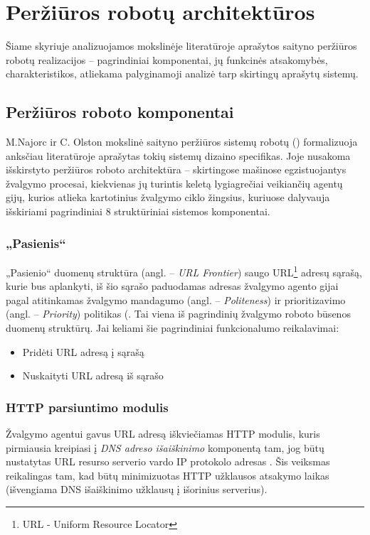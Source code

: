 \section{Peržiūros robotų architektūros}

Šiame skyriuje analizuojamos mokslinėje literatūroje aprašytos saityno peržiūros robotų realizacijos -- pagrindiniai komponentai, jų funkcinės atsakomybės, charakteristikos, atliekama palyginamoji analizė tarp skirtingų aprašytų sistemų.

\subsection{Peržiūros roboto komponentai}

M.Najorc ir C. Olston mokslinė saityno peržiūros sistemų robotų (\cite{StanfWebCrawl}) formalizuoja anksčiau literatūroje aprašytas tokių sistemų dizaino specifikas. Joje nusakoma išskirstyto peržiūros roboto architektūra -- skirtingose mašinose egzistuojantys žvalgymo procesai, kiekvienas jų turintis keletą lygiagrečiai veikiančių agentų gijų, kurios atlieka kartotinius žvalgymo ciklo žingsius, kuriuose dalyvauja išskiriami pagrindiniai 8 struktūriniai sistemos komponentai.

\subsubsection{„Pasienis“}

„Pasienio“ duomenų struktūra (angl. -- \textit{URL Frontier}) saugo URL\footnote{URL - Uniform Resource Locator} adresų sąrašą, kurie bus aplankyti, iš šio sąrašo paduodamas adresas žvalgymo agento gijai pagal atitinkamas žvalgymo mandagumo (angl. -- \textit{Politeness}) ir prioritizavimo (angl. -- \textit{Priority}) politikas (\cite{StanfWebCrawl}. Tai viena iš pagrindinių žvalgymo roboto būsenos duomenų struktūrų. Jai keliami šie pagrindiniai funkcionalumo reikalavimai:
\begin{itemize}
    \item Pridėti URL adresą į sąrašą
    \item Nuskaityti URL adresą iš sąrašo
\end{itemize}

\subsubsection{HTTP parsiuntimo modulis}

Žvalgymo agentui gavus URL adresą iškviečiamas HTTP modulis, kuris pirmiausia kreipiasi į \textit{DNS adreso išaiškinimo} komponentą tam, jog būtų nustatytas URL resurso serverio vardo IP protokolo adresas \cite{StanfWebCrawl}. Šis veiksmas reikalingas tam, kad būtų minimizuotas HTTP užklausos atsakymo laikas (išvengiama DNS išaiškinimo užklausų į išorinius serverius).

